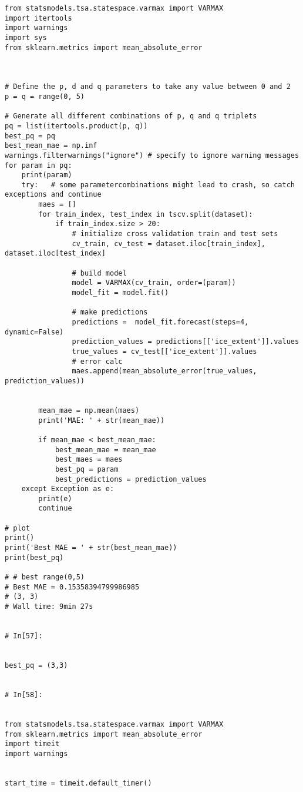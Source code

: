 \begin{verbatim}
from statsmodels.tsa.statespace.varmax import VARMAX
import itertools
import warnings
import sys
from sklearn.metrics import mean_absolute_error



# Define the p, d and q parameters to take any value between 0 and 2
p = q = range(0, 5)

# Generate all different combinations of p, q and q triplets
pq = list(itertools.product(p, q))
best_pq = pq
best_mean_mae = np.inf
warnings.filterwarnings("ignore") # specify to ignore warning messages
for param in pq:
    print(param)
    try:   # some parametercombinations might lead to crash, so catch exceptions and continue
        maes = []
        for train_index, test_index in tscv.split(dataset):
            if train_index.size > 20:
                # initialize cross validation train and test sets
                cv_train, cv_test = dataset.iloc[train_index], dataset.iloc[test_index]

                # build model
                model = VARMAX(cv_train, order=(param))
                model_fit = model.fit()

                # make predictions
                predictions =  model_fit.forecast(steps=4, dynamic=False)
                prediction_values = predictions[['ice_extent']].values
                true_values = cv_test[['ice_extent']].values
                # error calc
                maes.append(mean_absolute_error(true_values, prediction_values))

        
        mean_mae = np.mean(maes)
        print('MAE: ' + str(mean_mae))    

        if mean_mae < best_mean_mae:
            best_mean_mae = mean_mae
            best_maes = maes
            best_pq = param
            best_predictions = prediction_values
    except Exception as e:
        print(e)
        continue
   
# plot
print()
print('Best MAE = ' + str(best_mean_mae))
print(best_pq)

# # best range(0,5)
# Best MAE = 0.15358394799986985
# (3, 3)
# Wall time: 9min 27s


# In[57]:


best_pq = (3,3)


# In[58]:


from statsmodels.tsa.statespace.varmax import VARMAX
from sklearn.metrics import mean_absolute_error
import timeit
import warnings


start_time = timeit.default_timer()


\end{verbatim}
